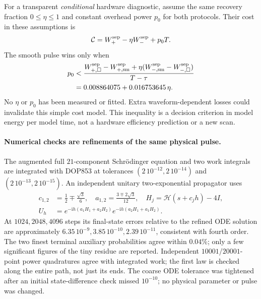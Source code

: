 \documentclass[11pt,a4paper]{article}
\newcommand{\ii}{\mathrm i}
\begin{document}
For a transparent \emph{conditional} hardware diagnostic, assume the
same recovery fraction $0\le\eta\le1$ and constant overhead power $p_0$
for both protocols. Their cost in these assumptions is
\begin{equation}
 \mathcal C=W_+^{\rm sep}-\eta W_-^{\rm sep}+p_0T.
\end{equation}
The smooth pulse wins only when
\begin{align}
 p_0&<\frac{W_{+,\square}^{\rm sep}-W_{+,\rm sm}^{\rm sep}
       +\eta(W_{-,\rm sm}^{\rm sep}-W_{-,\square}^{\rm sep})}{T-\tau}
       \nonumber\\
    &=0.008864075+0.016753645\,\eta.\label{overhead-gate}
\end{align}
No $\eta$ or $p_0$ has been measured or fitted. Extra waveform-dependent
losses could invalidate this simple cost model. This inequality is a
decision criterion in model energy per model time, not a hardware
efficiency prediction or a new scan.

\paragraph{Numerical checks are refinements of the same physical pulse.}
The augmented full $21$-component Schr\"odinger equation and two work
integrals are integrated with DOP853 at tolerances
$(2\,10^{-12},2\,10^{-14})$ and $(2\,10^{-13},2\,10^{-15})$.
An independent unitary two-exponential propagator uses
\begin{align}
 c_{1,2}&=\frac12\mp\frac{\sqrt3}{6},\quad
 a_{1,2}=\frac{3\mp2\sqrt3}{12},\quad H_j=\mathcal H(s+c_jh)-4I,\\
 U_h&=e^{-\ii h(a_1H_1+a_2H_2)}
       e^{-\ii h(a_2H_1+a_1H_2)}.
\end{align}
At $1024,2048,4096$ steps its final-state errors relative to the
refined ODE solution are approximately
$6.35\,10^{-9},3.85\,10^{-10},2.39\,10^{-11}$, consistent with fourth
order. The two finest terminal auxiliary probabilities agree within
$0.04\%$; only a few significant figures of the tiny residue are reported.
Independent $10001$/$20001$-point power quadratures agree with integrated
work; the first law is checked along the entire path, not just its ends.
The coarse ODE tolerance was tightened after an initial state-difference
check missed $10^{-10}$; no physical parameter or pulse was changed.
\end{document}
